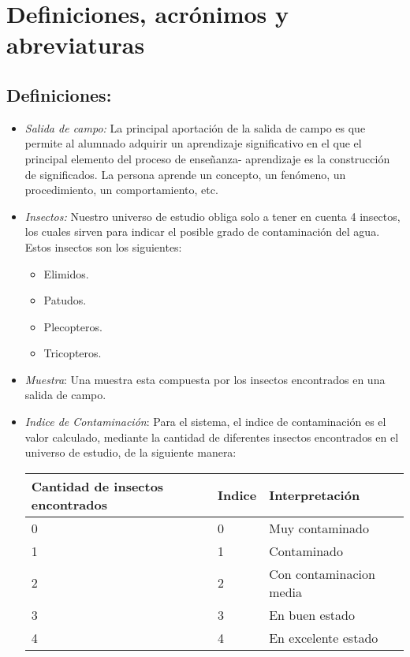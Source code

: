   \section{Definiciones, acrónimos y abreviaturas}

    \subsection{Definiciones:}
      \begin{itemize}
        
        \item \emph{Salida de campo:} La principal aportación de la salida de campo es que permite al alumnado adquirir un aprendizaje significativo en el que el principal elemento del proceso de enseñanza- aprendizaje es la construcción de significados. La persona aprende un concepto, un fenómeno, un procedimiento, un comportamiento, etc.
        
        \item \emph{Insectos:} Nuestro universo de estudio obliga solo a tener en cuenta 4 insectos, los cuales sirven para indicar el posible grado de contaminación del agua. Estos insectos son los siguientes:
        
        \begin{itemize}
          \item Elimidos.
          \item Patudos.
          \item Plecopteros.
          \item Tricopteros.
        \end{itemize}
        
        \item \emph{Muestra}: Una muestra esta compuesta por los insectos encontrados en una salida de campo. 
        
        \item \emph{Indice de Contaminación}: Para el sistema, el indice de contaminación es el valor calculado, mediante la cantidad de diferentes insectos encontrados en el universo de estudio, de la siguiente manera:
        
        \begin{table}[H]
          \centering
          \begin{tabular}{|p{3.8cm}|l|l|}
            \hline
            \centering
            Cantidad de insectos encontrados  & Indice & Interpretación \\ \hline 
            0                     & 0 & Muy contaminado \\ \hline
            1                     & 1 & Contaminado \\ \hline
            2                     & 2 & Con contaminacion media \\ \hline
            3                     & 3 & En buen estado \\ \hline
            4                     & 4 & En excelente estado \\ 
            \hline
          \end{tabular}
        \end{table}
        

\end{itemize}
